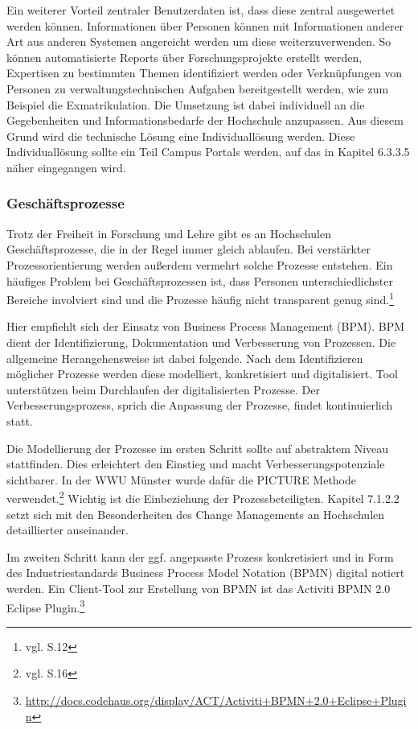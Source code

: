 Ein weiterer Vorteil zentraler Benutzerdaten ist, dass diese zentral ausgewertet werden können. Informationen über Personen können mit Informationen anderer Art aus anderen Systemen angereicht werden um diese weiterzuverwenden. So können automatisierte Reports über Forschungsprojekte erstellt werden, Expertisen zu bestimmten Themen identifiziert werden oder Verknüpfungen von Personen zu verwaltungstechnischen Aufgaben bereitgestellt werden, wie zum Beispiel die Exmatrikulation. Die Umsetzung ist dabei individuell an die Gegebenheiten und Informationsbedarfe der Hochschule anzupassen. Aus diesem Grund wird die technische Lösung eine Individuallösung werden. Diese Individuallösung sollte ein Teil Campus Portals werden, auf das in Kapitel 6.3.3.5 näher eingegangen wird. 

\subsubsection{Geschäftsprozesse}
Trotz der Freiheit in Forschung und Lehre gibt es an Hochschulen Geschäftsprozesse, die in der Regel immer gleich ablaufen. Bei verstärkter Prozessorientierung werden außerdem vermehrt solche Prozesse entstehen. Ein häufiges Problem bei Geschäftsprozessen ist, dass Personen unterschiedlichster Bereiche involviert sind und die Prozesse häufig nicht transparent genug sind.\footnote{vgl. \cite{becker_prozesse_2010} S.12}

Hier empfiehlt sich der Einsatz von Business Process Management (BPM). BPM dient der Identifizierung, Dokumentation und Verbesserung von Prozessen. Die allgemeine Herangehensweise ist dabei folgende. Nach dem Identifizieren möglicher Prozesse werden diese modelliert, konkretisiert und digitalisiert. Tool unterstützen beim Durchlaufen der digitalisierten Prozesse. Der Verbesserungsprozess, sprich die Anpassung der Prozesse, findet kontinuierlich statt.

Die Modellierung der Prozesse im ersten Schritt sollte auf abstraktem Niveau stattfinden. Dies erleichtert den Einstieg und macht Verbesserungspotenziale sichtbarer. In der WWU Münster wurde dafür die PICTURE Methode verwendet.\footnote{vgl. \cite{becker_prozesse_2010} S.16} Wichtig ist die Einbeziehung der Prozessbeteiligten. Kapitel 7.1.2.2 setzt sich mit den Besonderheiten des Change Managements an Hochschulen detaillierter auseinander.

Im zweiten Schritt kann der ggf. angepasste Prozess konkretisiert und in Form des Industriestandards Business Process Model Notation (BPMN) digital notiert werden. Ein Client-Tool zur Erstellung von BPMN ist das Activiti BPMN 2.0 Eclipse Plugin.\footnote{\url{http://docs.codehaus.org/display/ACT/Activiti+BPMN+2.0+Eclipse+Plugin}}

